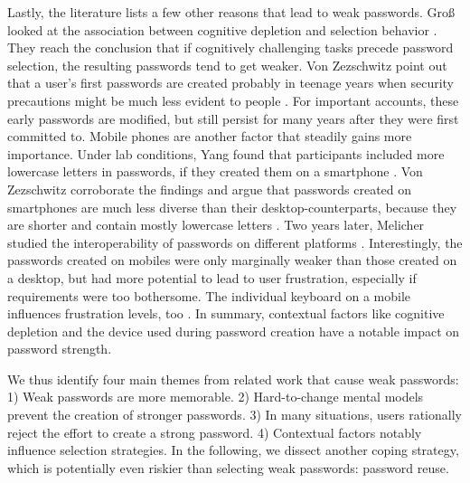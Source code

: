 	Lastly, the literature lists a few other reasons that lead to weak passwords. Groß \etal looked at the association between cognitive depletion and selection behavior \cite{Gross2016EffectCognitiveEffort}. They reach the conclusion that if cognitively challenging tasks precede password selection, the resulting passwords tend to get weaker. Von Zezschwitz \etal point out that a user's first passwords are created probably in teenage years when security precautions might be much less evident to people \cite{VonZezschwitz2013SurvivalShortest}. For important accounts, these early passwords are modified, but still persist for many years after they were first committed to. 
	Mobile phones are another factor that steadily gains more importance. Under lab conditions, Yang \etal found that participants included more lowercase letters in passwords, if they created them on a smartphone \cite{Yang2014EntryAffectsPasswordSecurity}. Von Zezschwitz \etal corroborate the findings and argue that passwords created on smartphones are much less diverse than their desktop-counterparts, because they are shorter and contain mostly lowercase letters \cite{VonZezschwitz2014HoneyIShrunkTheKeys}. Two years later, Melicher \etal studied the interoperability of passwords on different platforms \cite{Melicher2016UsabilityMobileTextPasswords}. Interestingly, the passwords created on mobiles were only marginally weaker than those created on a desktop, but had more potential to lead to user frustration, especially if requirements were too bothersome. The individual keyboard on a mobile influences frustration levels, too \cite{Haque2014PsychometricsStrongPassword}. 
	In summary, contextual factors like cognitive depletion and the device used during password creation have a notable impact on password strength. 
	
	We thus identify four main themes from related work that cause weak passwords: 1) Weak passwords are more memorable. 2) Hard-to-change mental models prevent the creation of stronger passwords. 3) In many situations, users rationally reject the effort to create a strong password. 4) Contextual factors notably influence selection strategies. In the following, we dissect another coping strategy, which is potentially even riskier than selecting weak passwords: password reuse.


